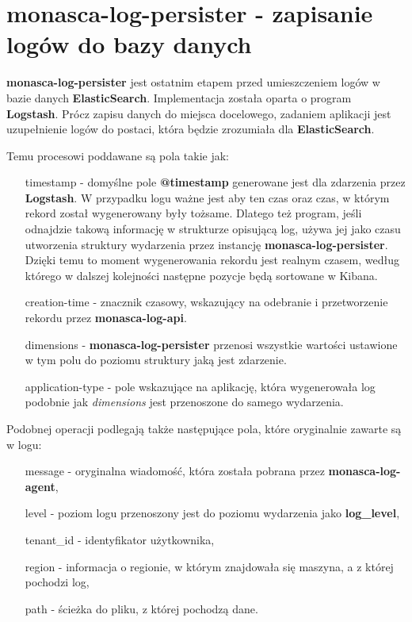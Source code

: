 \section{monasca-log-persister - zapisanie logów do bazy danych}
\label{chapter:monasca:monasca_log_persister}

\textbf{monasca-log-persister} jest ostatnim etapem przed umieszczeniem logów w bazie danych \textbf{ElasticSearch}.
Implementacja została oparta o program \textbf{Logstash}. Prócz zapisu danych do miejsca docelowego, zadaniem
aplikacji jest uzupełnienie logów do postaci, która będzie zrozumiała dla \textbf{ElasticSearch}. 


Temu procesowi poddawane są pola takie jak:
\begin{itemize}
    \item[timestamp] - domyślne pole \textbf{@timestamp} generowane jest dla zdarzenia przez \textbf{Logstash}. W przypadku
    logu ważne jest aby ten czas oraz czas, w którym rekord został wygenerowany były tożsame. Dlatego też program, jeśli
    odnajdzie takową informację w strukturze opisującą log, używa jej jako czasu utworzenia struktury wydarzenia przez instancję
    \textbf{monasca-log-persister}. Dzięki temu to moment wygenerowania rekordu jest realnym czasem, według którego w dalszej
    kolejności następne pozycje będą sortowane w Kibana.
    \item[creation-time] - znacznik czasowy, wskazujący na odebranie i przetworzenie rekordu przez \textbf{monasca-log-api}.
    \item[dimensions] - \textbf{monasca-log-persister} przenosi wszystkie wartości ustawione w tym polu do poziomu struktury
    jaką jest zdarzenie.
    \item[application-type] - pole wskazujące na aplikację, która wygenerowała log podobnie jak \textit{dimensions} jest przenoszone
    do samego wydarzenia.
\end{itemize}

Podobnej operacji podlegają także następujące pola, które oryginalnie zawarte są w logu:
\begin{itemize}
    \item[message] - oryginalna wiadomość, która została pobrana przez \textbf{monasca-log-agent},
    \item[level] - poziom logu przenoszony jest do poziomu wydarzenia jako \textbf{log\_level},
    \item[tenant\_id] - identyfikator użytkownika,
    \item[region] - informacja o regionie, w którym znajdowała się maszyna, a z której pochodzi log,
    \item[path] - ścieżka do pliku, z której pochodzą dane.
\end{itemize}